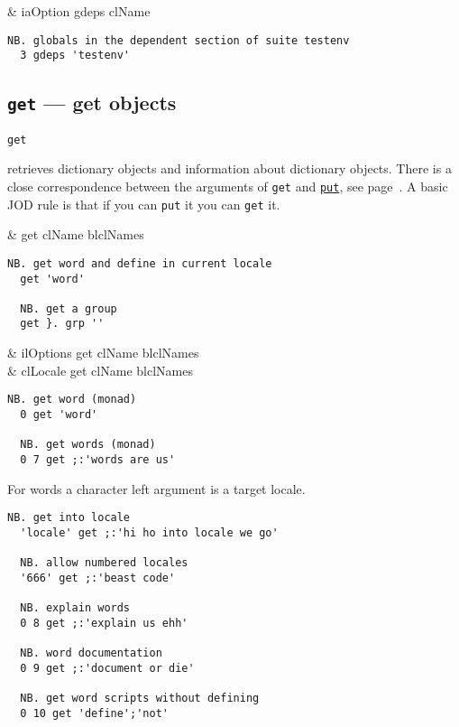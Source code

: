 \begin{wordhead}
\dyad & iaOption gdeps clName \\
\end{wordhead}
\begin{lstlisting}[frame=single,framerule=0pt]
  NB. globals in the dependent section of suite testenv
  3 gdeps 'testenv'  
\end{lstlisting}

\subsection{\texttt{get} --- get objects}\label{ss:get}

\hypertarget{il:get}{\texttt{get}} retrieves dictionary objects and information 
about dictionary objects. 
There is a close correspondence between the arguments of \texttt{get} 
and \hyperlink{il:put}{\texttt{put}}, see page~\pageref{ss:put}. 
A basic JOD rule is that if you can \texttt{put} it you can \texttt{get} it.

\begin{wordhead}
\monad & get clName \argsep blclNames \\
\end{wordhead}
\begin{lstlisting}[frame=single,framerule=0pt]
  NB. get word and define in current locale
  get 'word'  
  
  NB. get a group  
  get }. grp '' 
\end{lstlisting}

\begin{wordhead}
\dyad & ilOptions get clName \argsep blclNames \\
      & clLocale get clName \argsep blclNames \\
\end{wordhead}
\begin{lstlisting}[frame=single,framerule=0pt]
  NB. get word (monad)
  0 get 'word'  
  
  NB. get words (monad) 
  0 7 get ;:'words are us' 
\end{lstlisting} 

  For words a character left argument is a target locale.
  
\begin{lstlisting}[frame=single,framerule=0pt]  
  NB. get into locale
  'locale' get ;:'hi ho into locale we go'  
  
  NB. allow numbered locales
  '666' get ;:'beast code'  
    
  NB. explain words
  0 8 get ;:'explain us ehh'  
  
  NB. word documentation
  0 9 get ;:'document or die' 
  
  NB. get word scripts without defining 
  0 10 get 'define';'not' 
\end{lstlisting} 
    
